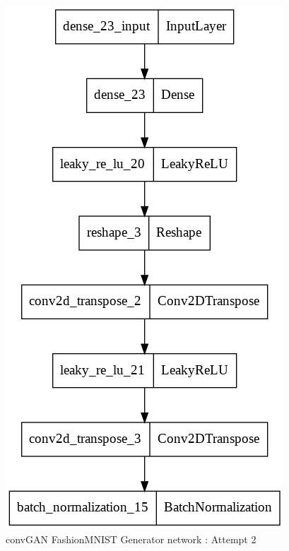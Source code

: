 \documentclass[conference]{IEEEtran}
\begin{document}
\begin{itemize}
    \begin{figure}[h]
    \centering
    \includegraphics[scale = 0.3]{convGAN_FMNIST_gen_model.png}
      \caption{convGAN FashionMNIST Generator network : Attempt 2}
    \end{figure}\\


\end{itemize}
\end{document}
